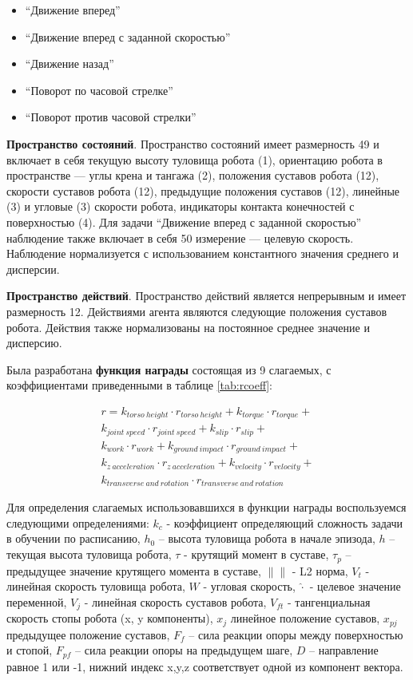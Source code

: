 \begin{itemize}
    \item ``Движение вперед''
	\item ``Движение вперед с заданной скоростью''
    \item ``Движение назад''
    \item ``Поворот по часовой стрелке''
    \item ``Поворот против часовой стрелки''
\end{itemize}

\textbf{Пространство состояний}. Пространство состояний имеет размерность 49 и включает в себя текущую высоту туловища робота (1), ориентацию робота в пространстве --- углы крена и тангажа (2), положения суставов робота (12), скорости суставов робота (12), предыдущие положения суставов (12), линейные (3) и угловые (3) скорости робота, индикаторы контакта конечностей с поверхностью (4). Для задачи ``Движение вперед с заданной скоростью'' наблюдение также включает в себя 50 измерение ---  целевую скорость. Наблюдение нормализуется с использованием константного значения среднего и дисперсии.

\textbf{Пространство действий}. Пространство действий является непрерывным и имеет размерность 12. Действиями агента являются следующие положения суставов робота. Действия также нормализованы на постоянное среднее значение и дисперсию.  

Была разработана \textbf{функция награды} состоящая из 9 слагаемых, с коэффициентами приведенными в таблице \ref{tab:rcoeff}:

\begin{multline}
    r = k_{torso\ height} \cdot r_{torso\ height} +
    k_{torque} \cdot r_{torque} +\\
    k_{joint\ speed} \cdot r_{joint\ speed} +
    k_{slip} \cdot r_{slip} +\\
    k_{work} \cdot r_{work} + 
    k_{ground\ impact} \cdot r_{ground\ impact} +\\
    k_{z\ acceleration} \cdot r_{z\ acceleration} +  k_{velocity} \cdot r_{velocity} +\\
    k_{transverse\ and\ rotation} \cdot r_{transverse\ and\ rotation}
\label{eq:unitree_reward}
\end{multline}


Для определения слагаемых использовавшихся в функции награды воспользуемся следующими определениями: 
 $k_c$ - коэффициент определяющий сложность задачи в обучении по расписанию, $h_0$ – высота туловища робота в начале эпизода, $h$ – текущая высота туловища робота, $\tau$ - крутящий момент в суставе, $\tau_p$ – предыдущее значение крутящего момента в суставе, $\lVert \rVert$ - L2 норма, $V_t$ - линейная скорость туловища робота, $W$ - угловая скорость, $\hat{\cdot}$ - целевое значение переменной, $V_j$ - линейная скорость суставов робота, $V_{ft}$ - тангенциальная скорость стопы робота (x, y компоненты), $x_j$ линейное положение суставов, $x_{pj}$ предыдущее положение суставов, $F_f$ – сила реакции опоры между поверхностью и стопой, $F_{pf}$ – сила реакции опоры на предыдущем шаге, $D$ – направление равное 1 или -1, нижний индекс x,y,z соответствует одной из компонент вектора. 

